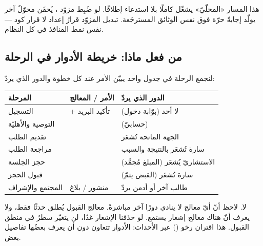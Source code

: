 \begin{keyp}
هذا المسار «المحلّيّ» يشغّل  كاملًا بلا استدعاء  إطلاقًا. لو ضُبِط
مزوّد ، يُحقَن محوّلٌ آخر يولّد إجابةً حرّة فوق نفس الوثائق المسترجَعة.
تبديل المزوّد قرارُ إعداد لا قرار كود — نفس نمط المنافذ في كل النظام.
\end{keyp}

\subsection{من فعل ماذا: خريطة الأدوار في الرحلة}

لنجمع الرحلة في جدول واحد يبيّن الأمر عند كل خطوة والدور الذي يردّ:

\begin{center}
\begin{tabular}{L{3.4cm} L{4.3cm} L{4.3cm}}
\toprule
المرحلة & الأمر / المعالج & الدور الذي يردّ \\
\midrule
التسجيل &  + تأكيد البريد & لا أحد (بوّابة دخول) \\
التوصية والأهليّة &  &  (حسابيّ) \\
تقديم الطلب &  & الجهة المانحة تُشعَر \\
مراجعة الطلب &  & سارة تُشعَر بالنتيجة والسبب \\
حجز الجلسة &  & الاستشاريّ يُشعَر (المبلغ مُجمَّد) \\
قبول الحجز &  & سارة تُشعَر (القبض يتمّ) \\
المجتمع والإشراف & منشور / بلاغ & طالب آخر أو أدمن يردّ \\
\bottomrule
\end{tabular}
\end{center}

\begin{qa}
لا. لاحظ أنّ أيّ معالج لا ينادي دورًا آخر مباشرةً. معالج القبول يُطلق حدثًا فقط،
ولا يعرف أنّ هناك معالج إشعار يستمع. لو حذفنا الإشعار غدًا، لن يتغيّر سطرٌ في منطق
القبول. هذا اقتران رخو () عبر الأحداث: الأدوار تتعاون دون أن
يعرف بعضُها تفاصيل بعض.
\end{qa}

